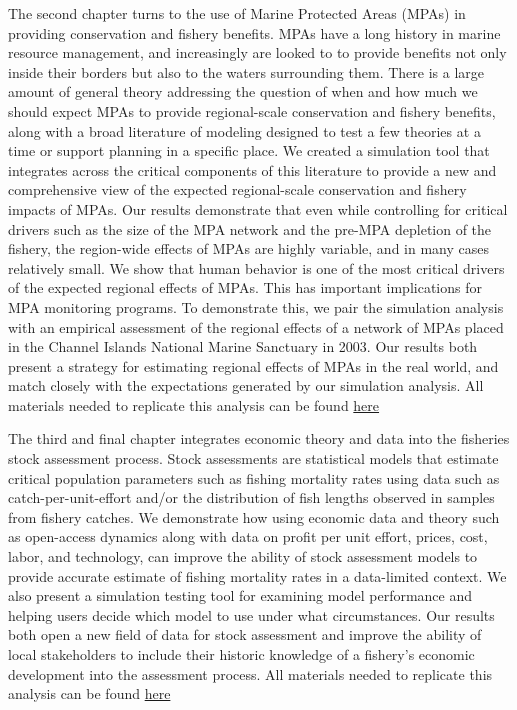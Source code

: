 \documentclass[twoside,12pt,final]{ucthesis-CA2012}
\begin{document}
\begin{ucmainmatter}
The second chapter turns to the use of Marine Protected Areas (MPAs) in
providing conservation and fishery benefits. MPAs have a long history in
marine resource management, and increasingly are looked to to provide
benefits not only inside their borders but also to the waters
surrounding them. There is a large amount of general theory addressing
the question of when and how much we should expect MPAs to provide
regional-scale conservation and fishery benefits, along with a broad
literature of modeling designed to test a few theories at a time or
support planning in a specific place. We created a simulation tool that
integrates across the critical components of this literature to provide
a new and comprehensive view of the expected regional-scale conservation
and fishery impacts of MPAs. Our results demonstrate that even while
controlling for critical drivers such as the size of the MPA network and
the pre-MPA depletion of the fishery, the region-wide effects of MPAs
are highly variable, and in many cases relatively small. We show that
human behavior is one of the most critical drivers of the expected
regional effects of MPAs. This has important implications for MPA
monitoring programs. To demonstrate this, we pair the simulation
analysis with an empirical assessment of the regional effects of a
network of MPAs placed in the Channel Islands National Marine Sanctuary
in 2003. Our results both present a strategy for estimating regional
effects of MPAs in the real world, and match closely with the
expectations generated by our simulation analysis. All materials needed
to replicate this analysis can be found
\href{https://github.com/DanOvando/zissou}{here}

The third and final chapter integrates economic theory and data into the
fisheries stock assessment process. Stock assessments are statistical
models that estimate critical population parameters such as fishing
mortality rates using data such as catch-per-unit-effort and/or the
distribution of fish lengths observed in samples from fishery catches.
We demonstrate how using economic data and theory such as open-access
dynamics along with data on profit per unit effort, prices, cost, labor,
and technology, can improve the ability of stock assessment models to
provide accurate estimate of fishing mortality rates in a data-limited
context. We also present a simulation testing tool for examining model
performance and helping users decide which model to use under what
circumstances. Our results both open a new field of data for stock
assessment and improve the ability of local stakeholders to include
their historic knowledge of a fishery's economic development into the
assessment process. All materials needed to replicate this analysis can
be found \href{https://github.com/DanOvando/scrooge}{here}


\end{ucmainmatter}
\end{document}
